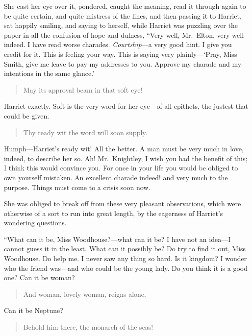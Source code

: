 She cast her eye over it, pondered, caught the meaning, read it through
again to be quite certain, and quite mistress of the lines, and then
passing it to Harriet, sat happily smiling, and saying to herself,
while Harriet was puzzling over the paper in all the confusion
of hope and dulness, ``Very well, Mr.\ Elton, very well indeed.
I have read worse charades.  \emph{Courtship}---a very good hint.  I give
you credit for it.  This is feeling your way.  This is saying very
plainly---`Pray, Miss Smith, give me leave to pay my addresses to you.
Approve my charade and my intentions in the same glance.'

\begin{verse}
      May its approval beam in that soft eye!
\end{verse}

Harriet exactly.  Soft is the very word for her eye---of all epithets,
the justest that could be given.

\begin{verse}
      Thy ready wit the word will soon supply.
\end{verse}

Humph---Harriet's ready wit! All the better.  A man must be very much
in love, indeed, to describe her so.  Ah! Mr.\ Knightley, I wish
you had the benefit of this; I think this would convince you.
For once in your life you would be obliged to own yourself mistaken.
An excellent charade indeed! and very much to the purpose.
Things must come to a crisis soon now.

She was obliged to break off from these very pleasant observations,
which were otherwise of a sort to run into great length, by the
eagerness of Harriet's wondering questions.

``What can it be, Miss Woodhouse?---what can it be? I have not an idea---I
cannot guess it in the least.  What can it possibly be? Do try
to find it out, Miss Woodhouse.  Do help me.  I never saw any thing
so hard.  Is it kingdom? I wonder who the friend was---and who could
be the young lady.  Do you think it is a good one? Can it be woman?

\begin{verse}
      And woman, lovely woman, reigns alone.
\end{verse}

Can it be Neptune?

\begin{verse}
      Behold him there, the monarch of the seas!
\end{verse}

